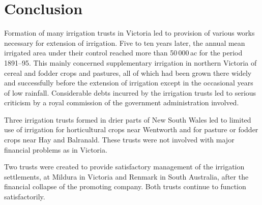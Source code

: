\section*{Conclusion}

Formation of many irrigation trusts in Victoria led to provision of
various works necessary for extension of irrigation.  Five to ten
years later, the annual mean irrigated area under their control
reached more than 50\,000\,ac for the period 1891--95.  This mainly
concerned supplementary irrigation in northern Victoria of cereal and
fodder crops and pastures, all of which had been grown there widely
and successfully before the extension of irrigation except in the
occasional years of low rainfall.  Considerable debts incurred by the
irrigation trusts led to serious criticism by a royal commission of
the government administration involved.

Three irrigation trusts formed in drier parts of New South Wales led
to limited use of irrigation for horticultural crops near Wentworth
and for pasture or fodder crops near Hay and Balranald.  These trusts
were not involved with major financial problems as in Victoria.

Two trusts were created to provide satisfactory management of the
irrigation settlements, at Mildura in Victoria and Renmark in South
Australia, after the financial collapse of the promoting company.
Both trusts continue to function satisfactorily.

